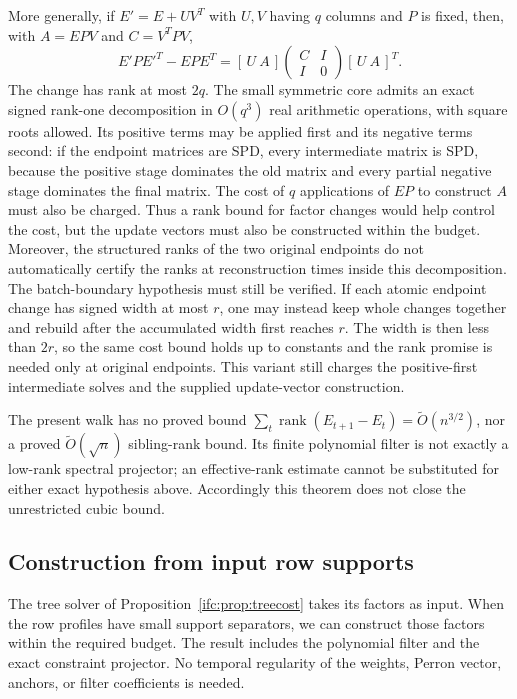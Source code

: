\documentclass[11pt]{amsart}
\theoremstyle{definition}\newtheorem{definition}[theorem]{Definition}
\theoremstyle{remark}\newtheorem{remark}[theorem]{Remark}
\numberwithin{equation}{section}
\newcommand{\rank}{\operatorname{rank}}
\begin{document}
More generally, if $E'=E+UV^T$ with $U,V$ having $q$ columns and $P$
is fixed, then, with $A=EPV$ and $C=V^TPV$,
\begin{equation}\label{ifc:dyn:factorchange}
 E'PE'^T-EPE^T
 = [\,U\ A\,]
   \begin{pmatrix}C&I\\ I&0\end{pmatrix}
   [\,U\ A\,]^T.
\end{equation}
The change has rank at most $2q$.  The small symmetric core admits an
exact signed rank-one decomposition in $O(q^3)$ real arithmetic
operations, with square roots allowed.  Its positive terms may be
applied first and its negative terms second: if the endpoint matrices
are SPD, every intermediate matrix is SPD, because the positive stage
dominates the old matrix and every partial negative stage dominates the
final matrix.  The cost of $q$ applications of $EP$ to construct $A$
must also be charged.  Thus a rank bound for factor changes would help control the cost, but
the update vectors must also be constructed within the budget.
Moreover, the structured ranks of the two original endpoints do not
automatically certify the ranks at reconstruction times inside this
decomposition.  The batch-boundary hypothesis must still be verified.
If each atomic endpoint change has signed width at most $r$, one may
instead keep whole changes together and rebuild after the accumulated
width first reaches $r$.  The width is then less than $2r$, so the same
cost bound holds up to constants and the rank promise is needed only
at original endpoints.  This variant still charges the positive-first
intermediate solves and the supplied update-vector construction.

The present walk has no proved bound
$\sum_t\rank(E_{t+1}-E_t)=\widetilde O(n^{3/2})$, nor a proved
$\widetilde O(\sqrt n)$ sibling-rank bound.  Its finite polynomial
filter is not exactly a low-rank spectral projector; an effective-rank
estimate cannot be substituted for either exact hypothesis above.
Accordingly this theorem does not close the unrestricted cubic bound.


\subsection{Construction from input row supports}
\label{ifc:sec:supportinterfaces}

The tree solver of Proposition~\ref{ifc:prop:treecost} takes its factors
as input. When the row profiles have small support separators, we can
construct those factors within the required budget. The result includes the polynomial filter and the exact
constraint projector. No temporal regularity of the weights, Perron vector,
anchors, or filter coefficients is needed.
\end{document}
